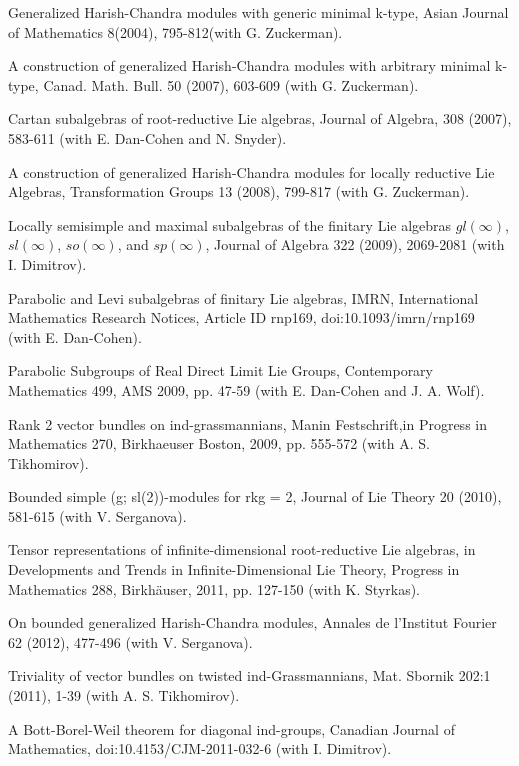 \documentclass[11pt]{amsart}
\begin{document}
\myss \label{41.} Generalized Harish-Chandra modules with generic minimal k-type,
Asian Journal of Mathematics 8(2004), 795-812(with G. Zuckerman).

\myss \label{42.} A construction of generalized Harish-Chandra modules with arbitrary minimal k-type, Canad. Math. Bull. 50 (2007), 603-609 (with G. Zuckerman). 

\myss \label{43.} Cartan subalgebras of root-reductive Lie algebras, Journal of Algebra, 308 (2007), 583-611 (with E. Dan-Cohen and N. Snyder).

\myss \label{44.} A construction of generalized Harish-Chandra modules for locally reductive Lie Algebras, Transformation Groups 13 (2008), 799-817 (with G. Zuckerman).

\myss \label{45.} Locally semisimple and maximal subalgebras of the finitary Lie algebras $gl(\infty)$, $sl(\infty)$, $so(\infty)$, and $sp(\infty)$, Journal of Algebra 322 (2009), 2069-2081 (with I. Dimitrov).

\myss \label{46.} Parabolic and Levi subalgebras of finitary Lie algebras, IMRN, International Mathematics Research Notices, Article ID rnp169, doi:10.1093/imrn/rnp169 (with E. Dan-Cohen).

\myss \label{47.} Parabolic Subgroups of Real Direct Limit Lie Groups, Contemporary Mathematics 499, AMS 2009, pp. 47-59 (with E. Dan-Cohen and J. A. Wolf).

\myss \label{48.} Rank 2 vector bundles on ind-grassmannians, Manin Festschrift,in Progress in Mathematics 270, Birkhaeuser Boston, 2009, pp. 555-572 (with A. S. Tikhomirov).

\myss \label{49.} Bounded simple (g; sl(2))-modules for rkg = 2, Journal of Lie Theory 20 (2010), 581-615 (with V. Serganova).

\myss \label{50.} Tensor representations of infinite-dimensional root-reductive Lie algebras, in Developments and Trends in Infinite-Dimensional Lie Theory, Progress in Mathematics 288, Birkh\"auser, 2011, pp. 127-150 (with K. Styrkas).

\myss \label{51.} On bounded generalized Harish-Chandra modules, Annales de l'Institut Fourier 62 (2012), 477-496 (with V. Serganova).

\myss \label{52.} Triviality of vector bundles on twisted ind-Grassmannians, Mat. Sbornik 202:1 (2011), 1-39 (with A. S. Tikhomirov).

\myss \label{53.} A Bott-Borel-Weil theorem for diagonal ind-groups, Canadian Journal of Mathematics, doi:10.4153/CJM-2011-032-6 (with I. Dimitrov).
\end{document}
